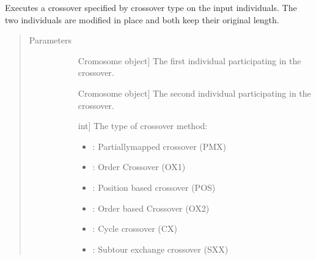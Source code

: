 \documentclass[letterpaper,10pt,english]{sphinxmanual}
\begin{document}
\begin{fulllineitems}
\label{\detokenize{pygace:pygace.ga.gaceCrossover}}
\sphinxAtStartPar
Executes a crossover specified by crossover type  on the input  individuals.
The two individuals are modified in place and both keep their original
length.
\begin{quote}\begin{description}
\item[{Parameters}] \leavevmode\begin{description}
\item[{}] \leavevmode{[}Cromosome object{]}
\sphinxAtStartPar
The first individual participating in the crossover.

\item[{}] \leavevmode{[}Cromosome object{]}
\sphinxAtStartPar
The second individual participating in the crossover.

\item[{}] \leavevmode{[}int{]}
\sphinxAtStartPar
The type of crossover method:
\begin{itemize}
\item {} 
\sphinxAtStartPar
{}: Partially\sphinxhyphen{}mapped crossover (PMX)

\item {} 
\sphinxAtStartPar
{}: Order Crossover (OX1)

\item {} 
\sphinxAtStartPar
{}: Position based crossover (POS)

\item {} 
\sphinxAtStartPar
{}: Order based Crossover (OX2)

\item {} 
\sphinxAtStartPar
{}: Cycle crossover (CX)

\item {} 
\sphinxAtStartPar
{}: Subtour exchange crossover (SXX)


\end{itemize}
\end{description}
\end{description}
\end{quote}
\end{fulllineitems}
\end{document}
